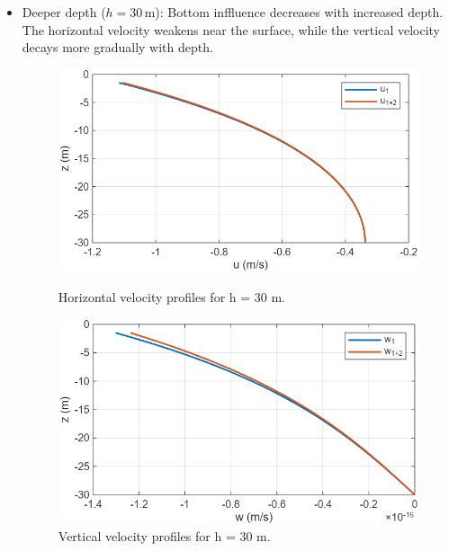 \documentclass[a4paper]{article}
\begin{document}
\begin{itemize}
    \item {Deeper depth (\( h = 30 \, \text{m} \))}: Bottom inffluence decreases with increased depth. The horizontal velocity weakens near the surface, while the vertical velocity decays more gradually with depth. 
    \begin{figure}[H]
        \centering
        \begin{minipage}{0.49\textwidth}
            \centering
            \includegraphics[width=\textwidth]{CE591HW1-Q1c3.png}
            \caption{\small Horizontal velocity profiles for h = 30 m.}
            \label{fig:plot2c_3}
        \end{minipage}
        \hfill
        \begin{minipage}{0.49\textwidth}
            \centering
            \includegraphics[width=\textwidth]{CE591HW1-Q1c4.png}
            \caption{\small Vertical velocity profiles for h = 30 m.}
            \label{fig:plot2c_4}
        \end{minipage}
    \end{figure}

\end{itemize}  
\vspace{0.5cm}
\end{document}

